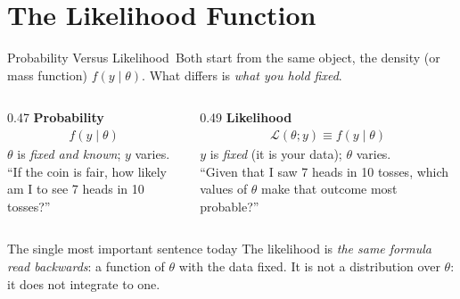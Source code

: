 \documentclass[aspectratio=169,11pt,xcolor=dvipsnames]{beamer}
\newcommand{\lik}{\mathcal{L}}
\newcommand{\core}{\,\raisebox{0.6pt}{\textcolor{corestar}{$\bigstar$}}}
\begin{document}
\section[The Likelihood]{The Likelihood Function}
\begin{frame}\sectionpage\end{frame}

\begin{frame}{Probability Versus Likelihood\core}
Both start from the same object, the density (or mass function) $f(y\mid\theta)$.
What differs is \emph{what you hold fixed}.
\vskip2pt
\begin{columns}[T]
\begin{column}{0.47\textwidth}
\textbf{Probability}
\begin{align*}
  f(y\mid\theta)
\end{align*}
$\theta$ is \emph{fixed and known}; $y$ varies.\\[4pt]
``If the coin is fair, how likely am I to see 7 heads in 10 tosses?''
\end{column}
\begin{column}{0.49\textwidth}
\textbf{Likelihood}
\begin{align*}
  \lik(\theta;y) \equiv f(y\mid\theta)
\end{align*}
$y$ is \emph{fixed} (it is your data); $\theta$ varies.\\[4pt]
``Given that I saw 7 heads in 10 tosses, which values of $\theta$ make that
outcome most probable?''
\end{column}
\end{columns}
\vskip4pt
\begin{alertblock}{The single most important sentence today}
The likelihood is \emph{the same formula read backwards}: a function of
$\theta$ with the data fixed. It is \alert{not} a distribution over
$\theta$: it does not integrate to one.
\end{alertblock}
\end{frame}
\end{document}
